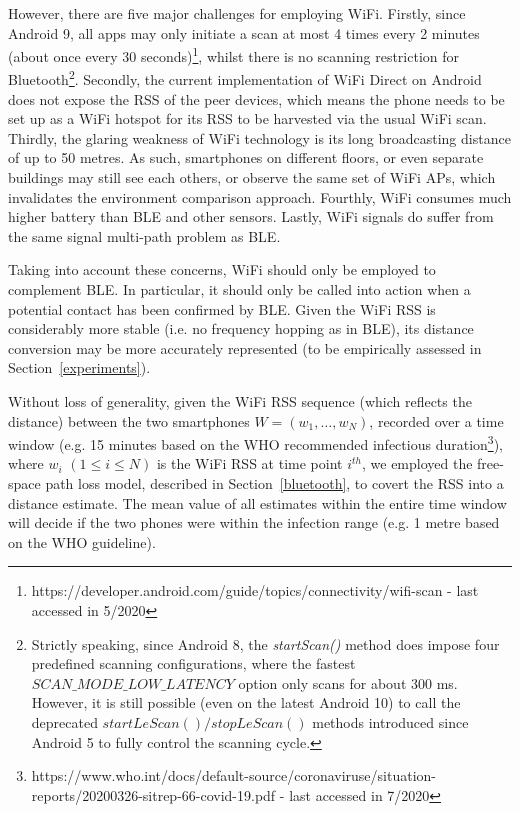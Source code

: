 \documentclass[graybox]{svmult}
\begin{document}
However, there are five major challenges for employing WiFi. Firstly, since Android 9, all apps may only initiate a scan at most 4 times every 2 minutes (about once every 30 seconds)\footnote{https://developer.android.com/guide/topics/connectivity/wifi-scan - last accessed in 5/2020}, whilst there is no scanning restriction for Bluetooth\footnote{Strictly speaking, since Android 8, the \textit{startScan()} method does impose four predefined scanning configurations, where the fastest $SCAN\_MODE\_LOW\_LATENCY$ option only scans for about 300 ms. However, it is still possible (even on the latest Android 10) to call the deprecated $startLeScan() / stopLeScan()$ methods introduced since Android 5 to fully control the scanning cycle.}. Secondly, the current implementation of WiFi Direct on Android does not expose the RSS of the peer devices, which means the phone needs to be set up as a WiFi hotspot for its RSS to be harvested via the usual WiFi scan. Thirdly, the glaring weakness of WiFi technology is its long broadcasting distance of up to 50 metres. As such, smartphones on different floors, or even separate buildings may still see each others, or observe the same set of WiFi APs, which invalidates the environment comparison approach. Fourthly, WiFi consumes much higher battery than BLE and other sensors. Lastly, WiFi signals do suffer from the same signal multi-path problem as BLE.

Taking into account these concerns, WiFi should only be employed to complement BLE. In particular, it should only be called into action when a potential contact has been confirmed by BLE. Given the WiFi RSS is considerably more stable (i.e. no frequency hopping as in BLE), its distance conversion may be more accurately represented (to be empirically assessed in Section~\ref{experiments}).

Without loss of generality, given the WiFi RSS sequence (which reflects the distance) between the two smartphones $W=(w_1, \dots, w_N)$, recorded over a time window (e.g. 15 minutes based on the WHO recommended infectious duration\footnote{https://www.who.int/docs/default-source/coronaviruse/situation-reports/20200326-sitrep-66-covid-19.pdf - last accessed in 7/2020}), where $w_i$ $(1 \leq i \leq N)$ is the WiFi RSS at time point $i^{th}$, we employed the free-space path loss model, described in Section~\ref{bluetooth}, to covert the RSS into a distance estimate. The mean value of all estimates within the entire time window will decide if the two phones were within the infection range (e.g. 1 metre based on the WHO guideline).
\end{document}
